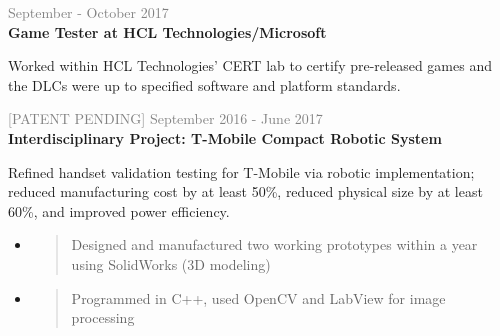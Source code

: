 \documentclass[letterpage]{article}
\begin{document}
\begin{minipage}[t]{0.63\linewidth}
\vspace{7px}
\textcolor{gray}{September - October 2017}\\
\textbf{\textsf{Game Tester at HCL Technologies/Microsoft}}\\
\raggedright
Worked within HCL Technologies' CERT lab to certify pre-released
games and the DLCs were up to specified software and platform standards.

\vspace{7px}
\textcolor{gray}{
  {\small[PATENT PENDING]\enspace}
  September 2016 - June 2017}\\
\textbf{\textsf{Interdisciplinary Project:
		T-Mobile Compact Robotic System}}\\
\raggedright
Refined handset validation testing for T-Mobile via robotic
implementation;\\reduced manufacturing cost by at least 50\%,
reduced physical size by at least 60\%, and improved
power efficiency.\\
\begin{itemize}[leftmargin=*,labelindent=1mm,labelsep=0mm]
\renewcommand\labelitemi{\rule[1mm]{0.33mm}{0.33mm}}
\renewcommand\labelitemii{$\blacksquare$}
\item
  \begin{quote}
  \raggedright
  Designed and manufactured two working prototypes within
  a year using SolidWorks (3D modeling)
  \end{quote}

\item
  \begin{quote}
  \raggedright
  Programmed in C++,
  used OpenCV and LabView for image processing
  \end{quote}
\end{itemize}


\end{minipage}
\end{document}
